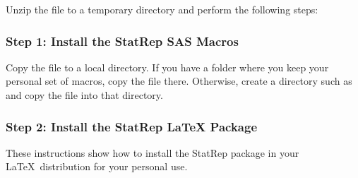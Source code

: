 \documentclass[article,oneside]{memoir}
\begin{document}
Unzip the file  to a temporary directory and
perform the following steps:

\subsubsection{Step 1: Install the StatRep SAS Macros}

   Copy the file  to a local directory. If you have a
   folder where you keep your personal set of macros, copy the file
   there. Otherwise, create a directory such as
    and copy the file into that directory.

\subsubsection{Step 2: Install the StatRep LaTeX Package}

   These instructions show how to install the StatRep package
   in your \LaTeX\ distribution for your personal use.
\end{document}
